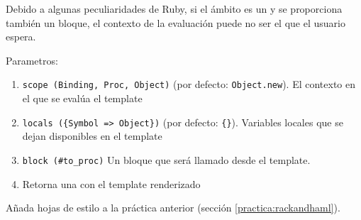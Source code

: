 Debido a algunas peculiaridades de Ruby, si el ámbito es un
\Binding{} y se proporciona también un bloque, el contexto de la evaluación
puede no ser el que el usuario espera.


Parametros:
\begin{enumerate}
\item 
\verb|scope (Binding, Proc, Object)| (por defecto: \verb|Object.new|).
El contexto en el que se evalúa el template

\item 
\verb|locals ({Symbol => Object})| (por defecto: \verb|{}|).
Variables locales que se dejan disponibles en el  template
\item 
\verb|block (#to_proc)| 
Un bloque que será llamado desde el template.

\item 
Retorna una \String{} con el template renderizado
\end{enumerate}

\label{practica:rpscss}

Añada hojas de estilo a la práctica anterior (sección \ref{practica:rackandhaml}).

